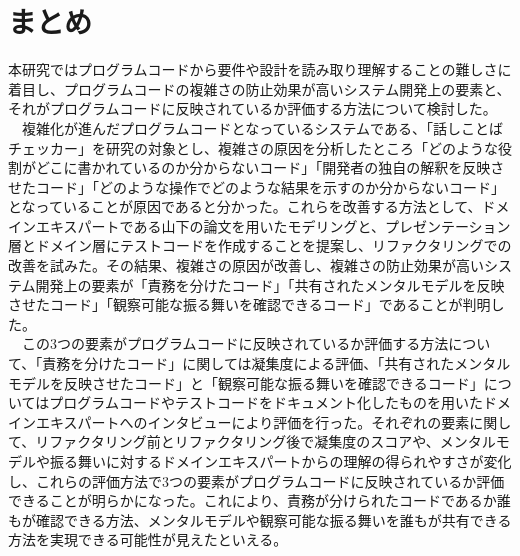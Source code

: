 \documentclass[12pt, a4paper]{jreport}
\begin{document}
\section{まとめ}
本研究ではプログラムコードから要件や設計を読み取り理解することの難しさに着目し、プログラムコードの複雑さの防止効果が高いシステム開発上の要素と、それがプログラムコードに反映されているか評価する方法について検討した。
\\　複雑化が進んだプログラムコードとなっているシステムである、「話しことばチェッカー」を研究の対象とし、複雑さの原因を分析したところ「どのような役割がどこに書かれているのか分からないコード」「開発者の独自の解釈を反映させたコード」「どのような操作でどのような結果を示すのか分からないコード」となっていることが原因であると分かった。これらを改善する方法として、ドメインエキスパートである山下の論文を用いたモデリングと、プレゼンテーション層とドメイン層にテストコードを作成することを提案し、リファクタリングでの改善を試みた。その結果、複雑さの原因が改善し、複雑さの防止効果が高いシステム開発上の要素が「責務を分けたコード」「共有されたメンタルモデルを反映させたコード」「観察可能な振る舞いを確認できるコード」であることが判明した。
\\　この3つの要素がプログラムコードに反映されているか評価する方法について、「責務を分けたコード」に関しては凝集度による評価、「共有されたメンタルモデルを反映させたコード」と「観察可能な振る舞いを確認できるコード」についてはプログラムコードやテストコードをドキュメント化したものを用いたドメインエキスパートへのインタビューにより評価を行った。それぞれの要素に関して、リファクタリング前とリファクタリング後で凝集度のスコアや、メンタルモデルや振る舞いに対するドメインエキスパートからの理解の得られやすさが変化し、これらの評価方法で3つの要素がプログラムコードに反映されているか評価できることが明らかになった。これにより、責務が分けられたコードであるか誰もが確認できる方法、メンタルモデルや観察可能な振る舞いを誰もが共有できる方法を実現できる可能性が見えたといえる。
\end{document}
